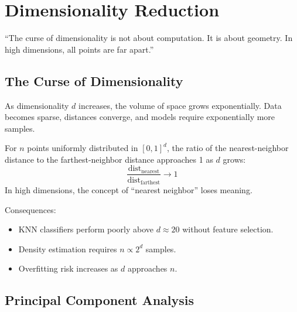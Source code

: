 \chapter{Dimensionality Reduction}
\label{ch:dimensionality-reduction}

\epigraph{``The curse of dimensionality is not about computation. It is about geometry. In high dimensions, all points are far apart.''}{}


\section{The Curse of Dimensionality}

As dimensionality $d$ increases, the volume of space grows exponentially. Data becomes sparse, distances converge, and models require exponentially more samples.

\begin{example}
	For $n$ points uniformly distributed in $[0, 1]^d$, the ratio of the nearest-neighbor distance to the farthest-neighbor distance approaches 1 as $d$ grows:
	\[
		\frac{\text{dist}_{\text{nearest}}}{\text{dist}_{\text{farthest}}} \to 1
	\]
	In high dimensions, the concept of ``nearest neighbor'' loses meaning.
\end{example}

Consequences:
\begin{itemize}
	\item KNN classifiers perform poorly above $d \approx 20$ without feature selection.
	\item Density estimation requires $n \propto 2^d$ samples.
	\item Overfitting risk increases as $d$ approaches $n$.
\end{itemize}

\section{Principal Component Analysis}

